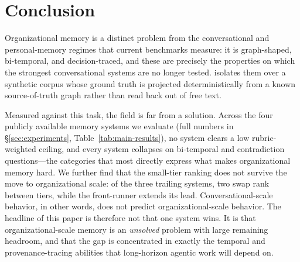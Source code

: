 
\section{Conclusion}
\label{sec:conclusion}

Organizational memory is a distinct problem from the conversational and
personal-memory regimes that current benchmarks measure: it is graph-shaped,
bi-temporal, and decision-traced, and these are precisely the properties on
which the strongest conversational systems are no longer tested. \bench{}
isolates them over a synthetic corpus whose ground truth is
projected deterministically from a known source-of-truth graph rather than read
back out of free text.

Measured against this task, the field is far from a solution. Across the four
publicly available memory systems we evaluate (full numbers in
\S\ref{sec:experiments}, Table~\ref{tab:main-results}), no system clears a low
rubric-weighted ceiling, and every
system collapses on bi-temporal and contradiction questions---the categories that
most directly express what makes organizational memory hard. We further find that
the small-tier ranking does not survive the move to organizational scale: of the
three trailing systems, two swap rank between tiers, while the front-runner
extends its lead. Conversational-scale behavior, in other words, does not predict
organizational-scale behavior. The headline of this paper is therefore not that
one system wins. It is that organizational-scale memory is an \emph{unsolved}
problem with large remaining headroom, and that the gap is concentrated in
exactly the temporal and provenance-tracing abilities that long-horizon agentic
work will depend on.

